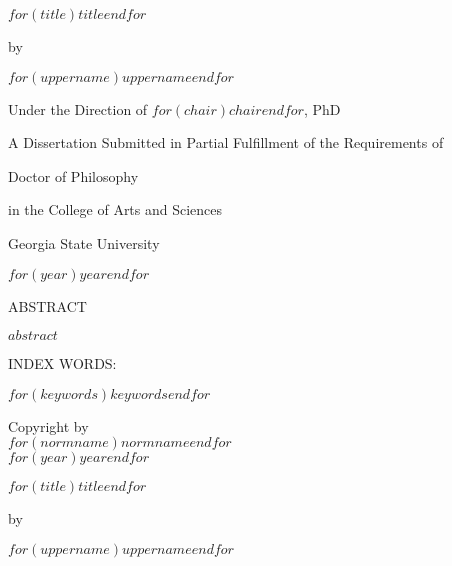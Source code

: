 \documentclass[12pt]{report}
\providecommand{\titlediss}{$for(title)$$title$$endfor$}
\renewenvironment{abstract}{
\begin{center}
{ABSTRACT \vspace{0.2in}}
\end{center}
}{}
\begin{document}
\begin{center}
\parbox[]{\textwidth}{\centering\titlediss}
\end{center}
\vspace{0.4in}
\centerline{by}
\vspace*{0.5in}
\centerline{$for(uppername)$$uppername$$endfor$}
\vspace*{0.5in}
\centerline{Under the Direction of $for(chair)$$chair$$endfor$, PhD}
\vspace{1.0in}



\centerline{A Dissertation Submitted in Partial Fulfillment of the Requirements of }
\centerline{Doctor of Philosophy}
\centerline{in the College of Arts and Sciences}
\centerline{Georgia State University}
\centerline{$for(year)$$year$$endfor$}
\newpage

\newpage 

\begin{abstract}

$abstract$


\end{abstract} 
\begin{singlespace}
  \vspace{0.5in}
  \noindent INDEX WORDS:
  \hspace{0.2in}
  \parbox[t]{4.5in}{$for(keywords)$$keywords$$endfor$}
\end{singlespace}

\newpage

\vspace*{0.7\textheight}
\begin{center}
  \parbox[]{\textwidth}{
    \begin{center}
      Copyright by \\
      $for(normname)$$normname$$endfor$ \\
      $for(year)$$year$$endfor$
    \end{center}}
\end{center}

\newpage






\begin{center}
  \parbox[]{\textwidth}{\centering \titlediss}
  \end{center}
  
  \vspace*{0.5in}
  \centerline{by}
  \vspace*{0.5in}
  \centerline{$for(uppername)$$uppername$$endfor$}
  \vspace*{1in}
  
\end{document}
